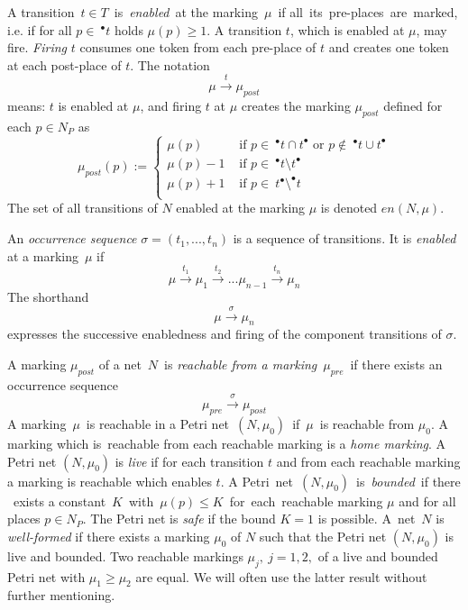 \documentclass{fundam}
\begin{document}
\begin{remark}
\begin{enumerate}
\medskip\noindent
A transition $\,t \in T\,$ is $\,$\emph{enabled}$\,$ at the marking $\,\mu\,$ if all$\,$ its $\,$pre-places$\,$ are$\,$ marked, i.e. if for all  $p\in\ ^\bullet t$ holds $\mu(p) \geq 1$. A transition $t$, which is enabled at $\mu$, may fire. \emph{Firing} $t$ consumes one token from each pre-place of $t$ and creates one token at each post-place of $t$. The notation
$$\mu \xrightarrow{t} \mu_{post}$$
means: $t$ is enabled at $\mu$, and firing $t$ at $\mu$ creates the marking $\mu_{post}$ defined for each $p \in N_P$ as
$$\mu_{post}(p):=\begin{cases}
\mu(p)	 & \text{ if } p \in\ ^\bullet t \cap t^\bullet \text{ or } p \not\in\ ^\bullet t \cup t^\bullet \\
\mu(p)-1 & \text{ if } p \in\ ^\bullet t \setminus t^\bullet \\
\mu(p)+1& \text{ if } p \in\ t^\bullet \setminus ^\bullet t \\
\end{cases}$$
The set of all transitions of $N$ enabled at the marking $\mu$ is denoted $en(N,\mu)$.\bigskip

An \emph{occurrence sequence} $\sigma=(t_1,...,t_n)$ is a sequence of transitions. It is \emph{enabled} at a \mbox{marking $\mu$} if
$$\mu \xrightarrow{t_1} \mu_1 \xrightarrow{t_2} ... \mu_{n-1} \xrightarrow{t_n} \mu_n$$
The shorthand
$$\mu \xrightarrow{\sigma} \mu_n$$
expresses the successive enabledness and firing of the component transitions of $\sigma$.\medskip

A marking $\mu_{post}$ of a net $\,N\,$ is \emph{reachable from a marking} $\,\mu_{pre}\,$ if there exists an occurrence sequence
$$\mu_{pre} \xrightarrow{\sigma} \mu_{post}$$
A marking $\,\mu\,$ is reachable in a Petri net $\,(N,\mu_0)\,$ if $\,\mu\,$ is reachable from $\mu_0$. A marking which
is~reachable from each reachable marking is a \emph{home marking}. A Petri net $(N,\mu_0)$ is \emph{live} if for
each transition $t$ and from each reachable mark\-ing a marking is reachable which enables $t$. A Petri$\,$ net $\,(N,\mu_0)\,$
is $\,$\emph{bounded}$\,$ if there$\,$ exists a constant $\,K\,$ with $\,\mu(p) \leq K\,$ for$\,$ each$\,$ reachable  marking $\mu$
and for all places {$p\in N_P$}.\! The Petri net is \emph{safe} if the bound $K\!=\!1$ is possible.
A~net~{$N$} is \emph{well-formed} if there exists a marking $\mu_0$ of $N$ such that the Petri net $(N,\mu_0)$
is live and bounded. Two reachable markings $\mu_j,\ j=1,2,$ of a live and bounded Petri net with
$\mu_1 \geq \mu_2$ are equal. We will often use the latter result without further mentioning.\medskip


\end{enumerate}
\end{remark}
\end{document}
